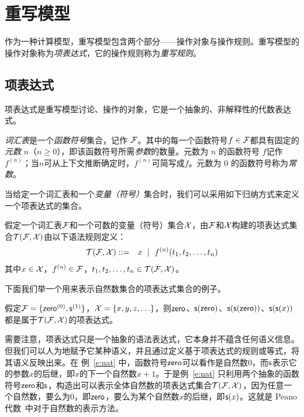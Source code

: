 \section{重写模型} 
\label{s:rewritesystem}

作为一种计算模型，重写模型包含两个部分——操作对象与操作规则。重写模型的操作对象称为\emph{项表达式}，它的操作规则称为\emph{重写规则}。

\subsection{项表达式}

项表达式是重写模型讨论、操作的对象，它是一个抽象的、非解释性的代数表达式。

\emph{词汇表}是一个\emph{函数符号}集合，记作 $\mathcal{F}$。其中的每一个函数符号$f\in\mathcal{F}$都具有固定的\emph{元数} $n$（$n\ge 0$），即该函数符号所需\emph{参数}的数量。元数为 $n$ 的函数符号 $f$记作$f^{(n)}$；当$n$可从上下文推断确定时，$f^{(n)}$可简写成$f$。元数为 $0$ 的函数符号称为\emph{常数}。

当给定一个词汇表和一个\emph{变量（符号）}集合时，我们可以采用如下归纳方式来定义一个项表达式的集合。

\begin{definition}[项表达式]
\label{d:term}
假定一个词汇表$\mathcal{F}$和一个可数的变量（符号）集合$\mathcal{X}$，由$\mathcal{F}$和$\mathcal{X}$构建的项表达式集合$\mathcal{T}(\mathcal{F},\mathcal{X})$由以下语法规则定义：
\begin{eqnarray}
    \mathcal{T}(\mathcal{F},\mathcal{X}) & ::= & x ~\mid~ f^{(n)}(t_1,t_2,\ldots,t_n) \nonumber 
\end{eqnarray}
其中$x\in\mathcal{X}$，$f^{(n)}\in\mathcal{F}$，$t_1,t_2,\ldots,t_n\in\mathcal{T}(\mathcal{F},\mathcal{X})$。
\end{definition}

下面我们举一个用来表示自然数集合的项表达式集合的例子。

\begin{example}
\label{e:nat}
假定$\mathcal{F} = \{\operatorname{\mathsf{zero}}^{(0)}, \operatorname{\mathsf{s}}^{(1)}\}$，$\mathcal{X}=\{x,y,z,\ldots\}$，则$\operatorname{\mathsf{zero}}$、$\operatorname{\mathsf{s}}(\operatorname{\mathsf{zero}})$、$\operatorname{\mathsf{s}}(\operatorname{\mathsf{s}}(\operatorname{\mathsf{zero}}))$、$\operatorname{\mathsf{s}}(\operatorname{\mathsf{s}}(x))$都是属于$\mathcal{T}(\mathcal{F},\mathcal{X})$的项表达式。
\end{example}

需要注意，项表达式只是一个抽象的语法表达式，它本身并不蕴含任何语义信息。但我们可以人为地赋予它某种语义，并且通过定义基于项表达式的规则或等式，将其语义反映出来。在
例~\ref{e:nat} 中，函数符号$\operatorname{\mathsf{zero}}$可以看作是自然数$0$，而$\operatorname{\mathsf{s}}$表示它的参数$x$的后继，即$x$的下一个自然数$x+1$。于是例~\ref{e:nat} 只利用两个抽象的函数符号$\operatorname{\mathsf{zero}}$和$\operatorname{\mathsf{s}}$，构造出可以表示全体自然数的项表达式集合$\mathcal{T}(\mathcal{F},\mathcal{X})$，因为任意一个自然数，要么为$0$，即$\operatorname{\mathsf{zero}}$，要么为某个自然数$x$的后继，即$\operatorname{\mathsf{s}}(x)$。这就是 Peano 代数~\cite{Kaye1991-KAYMOP}中对于自然数的表示方法。

